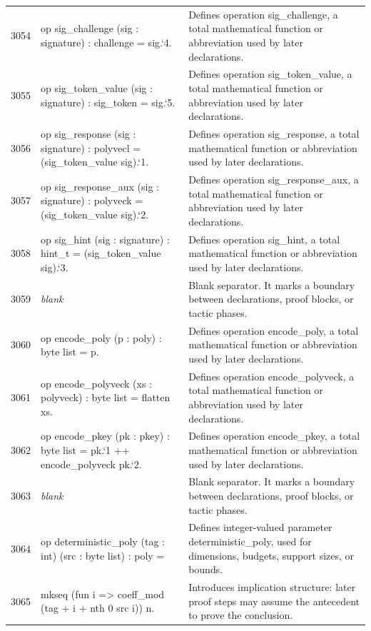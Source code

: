 \documentclass[10pt]{article}
\begin{document}
\begin{longtable}{r L{0.53\textwidth} L{0.37\textwidth}}
3054 & {\ttfamily\scriptsize op sig\_challenge (sig : signature) : challenge = sig.`4.} & Defines operation sig\_challenge, a total mathematical function or abbreviation used by later declarations. \\
3055 & {\ttfamily\scriptsize op sig\_token\_value (sig : signature) : sig\_token = sig.`5.} & Defines operation sig\_token\_value, a total mathematical function or abbreviation used by later declarations. \\
3056 & {\ttfamily\scriptsize op sig\_response (sig : signature) : polyvecl = (sig\_token\_value sig).`1.} & Defines operation sig\_response, a total mathematical function or abbreviation used by later declarations. \\
3057 & {\ttfamily\scriptsize op sig\_response\_aux (sig : signature) : polyveck = (sig\_token\_value sig).`2.} & Defines operation sig\_response\_aux, a total mathematical function or abbreviation used by later declarations. \\
3058 & {\ttfamily\scriptsize op sig\_hint (sig : signature) : hint\_t = (sig\_token\_value sig).`3.} & Defines operation sig\_hint, a total mathematical function or abbreviation used by later declarations. \\
3059 & {\ttfamily\scriptsize \emph{blank}} & Blank separator.  It marks a boundary between declarations, proof blocks, or tactic phases. \\
3060 & {\ttfamily\scriptsize op encode\_poly (p : poly) : byte list = p.} & Defines operation encode\_poly, a total mathematical function or abbreviation used by later declarations. \\
3061 & {\ttfamily\scriptsize op encode\_polyveck (xs : polyveck) : byte list = flatten xs.} & Defines operation encode\_polyveck, a total mathematical function or abbreviation used by later declarations. \\
3062 & {\ttfamily\scriptsize op encode\_pkey (pk : pkey) : byte list = pk.`1 ++ encode\_polyveck pk.`2.} & Defines operation encode\_pkey, a total mathematical function or abbreviation used by later declarations. \\
3063 & {\ttfamily\scriptsize \emph{blank}} & Blank separator.  It marks a boundary between declarations, proof blocks, or tactic phases. \\
3064 & {\ttfamily\scriptsize op deterministic\_poly (tag : int) (src : byte list) : poly =} & Defines integer-valued parameter deterministic\_poly, used for dimensions, budgets, support sizes, or bounds. \\
3065 & {\ttfamily\scriptsize   mkseq (fun i => coeff\_mod (tag + i + nth 0 src i)) n.} & Introduces implication structure: later proof steps may assume the antecedent to prove the conclusion. \\

\end{longtable}
\end{document}
